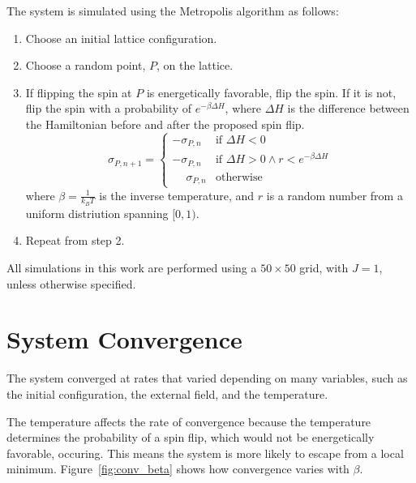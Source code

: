 \documentclass[]{article}
\begin{document}
The system is simulated using the Metropolis algorithm\cite{metropolis1953} as follows:
\begin{enumerate}
	\item Choose an initial lattice configuration.
	\item Choose a random point, $P$, on the lattice.
	\item If flipping the spin at $P$ is energetically favorable, flip the spin.
		If it is not, flip the spin with a probability of $e^{-\beta \Delta \! H}$, where $\Delta \! H$ is the difference between the Hamiltonian before and after the proposed spin flip.
		\[
			\sigma_{P,n+1} =
			\begin{cases}
				-\sigma_{P,n} & \text{if } \Delta \! H < 0 \\
				-\sigma_{P,n} & \text{if } \Delta \! H > 0 \wedge r < e^{- \beta \Delta \! H} \\
				\phantom{-}\sigma_{P,n} & \text{otherwise}
			\end{cases}
		\]
		where $\beta = \frac{1}{k_{B} T}$ is the inverse temperature, and $r$ is a random number from a uniform distriution spanning $[0,1)$.
	\item Repeat from step 2.
\end{enumerate}

All simulations in this work are performed using a $50 \times 50$ grid, with $J=1$, unless otherwise specified.

\section{System Convergence}
The system converged at rates that varied depending on many variables, such as the initial configuration, the external field, and the temperature.

The temperature affects the rate of convergence because the temperature determines the probability of a spin flip, which would not be energetically favorable, occuring. This means the system is more likely to escape from a local minimum. Figure~\ref{fig:conv_beta} shows how convergence varies with $\beta$.
\end{document}
